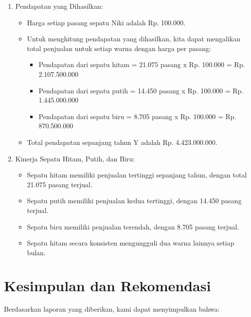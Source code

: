 \documentclass[letterpaper,11pt]{article}
\begin{document}
\begin{enumerate}
      \item Pendapatan yang Dihasilkan:
      \begin{itemize}
          \item Harga setiap pasang sepatu Niki adalah Rp. 100.000.
          \item Untuk menghitung pendapatan yang dihasilkan, kita dapat mengalikan total penjualan untuk setiap warna dengan harga per pasang:
          \begin{itemize}
              \item Pendapatan dari sepatu hitam = 21.075 pasang x Rp. 100.000 = Rp. 2.107.500.000
              \item Pendapatan dari sepatu putih = 14.450 pasang x Rp. 100.000 = Rp. 1.445.000.000
              \item Pendapatan dari sepatu biru = 8.705 pasang x Rp. 100.000 = Rp. 870.500.000
          \end{itemize}
          \item Total pendapatan sepanjang tahun Y adalah Rp. 4.423.000.000.
          \\
      \end{itemize} 

      \item Kinerja Sepatu Hitam, Putih, dan Biru:
      \begin{itemize}
          \item Sepatu hitam memiliki penjualan tertinggi sepanjang tahun, dengan total 21.075 pasang terjual.
          \item Sepatu putih memiliki penjualan kedua tertinggi, dengan 14.450 pasang terjual.
          \item Sepatu biru memiliki penjualan terendah, dengan 8.705 pasang terjual.
          \item Sepatu hitam secara konsisten mengungguli dua warna lainnya setiap bulan.
      \end{itemize}
  \end{enumerate}
  
\section{Kesimpulan dan Rekomendasi}
  Berdasarkan laporan yang diberikan, kami dapat menyimpulkan bahwa:
\end{document}

